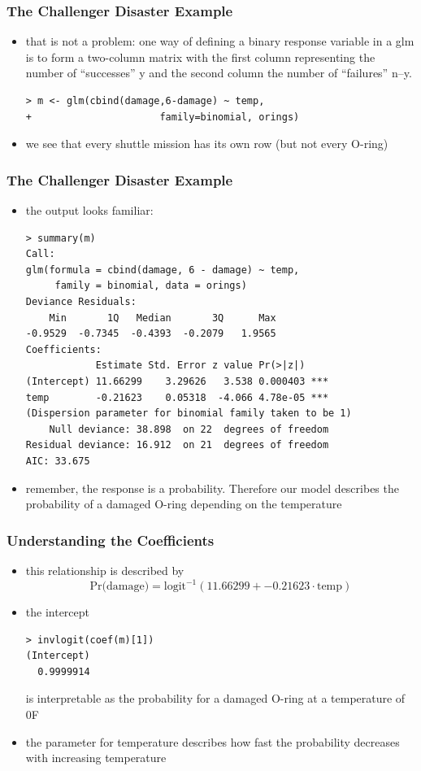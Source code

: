 \begin{frame}[fragile]\frametitle{The Challenger Disaster Example}
\begin{itemize}
\item that is not a problem: one way of defining a binary response variable in a glm is to form a two-column matrix with the first
column representing the number of “successes” y and the second column the number of “failures” n–y.
\begin{verbatim}
> m <- glm(cbind(damage,6-damage) ~ temp,
+                      family=binomial, orings)
\end{verbatim}
\normalsize
\item we see that every shuttle mission has its own row (but not every O-ring)
\end{itemize}
\end{frame}

\begin{frame}[fragile]\frametitle{The Challenger Disaster Example}
\begin{itemize}
\item the output looks familiar:\footnotesize
\begin{verbatim}
> summary(m)
Call:
glm(formula = cbind(damage, 6 - damage) ~ temp, 
     family = binomial, data = orings)
Deviance Residuals: 
    Min       1Q   Median       3Q      Max  
-0.9529  -0.7345  -0.4393  -0.2079   1.9565  
Coefficients:
            Estimate Std. Error z value Pr(>|z|)    
(Intercept) 11.66299    3.29626   3.538 0.000403 ***
temp        -0.21623    0.05318  -4.066 4.78e-05 ***
(Dispersion parameter for binomial family taken to be 1)
    Null deviance: 38.898  on 22  degrees of freedom
Residual deviance: 16.912  on 21  degrees of freedom
AIC: 33.675
\end{verbatim}
\item remember, the response is a probability. Therefore our model describes the probability of a damaged O-ring depending on the temperature
\end{itemize}
\end{frame}


\begin{frame}[fragile]\frametitle{Understanding the Coefficients}
\begin{itemize}
\item this relationship is described by $$\mbox{Pr(damage)}=\mbox{logit}^{-1}(11.66299 + -0.21623 \cdot \mbox{temp}) $$
\item the intercept
\begin{verbatim}
> invlogit(coef(m)[1])
(Intercept) 
  0.9999914 
\end{verbatim}
is interpretable as the probability for a damaged O-ring at a temperature of 0\degree F
\item the parameter for temperature describes how fast the probability decreases with increasing temperature
\end{itemize}
\end{frame}

